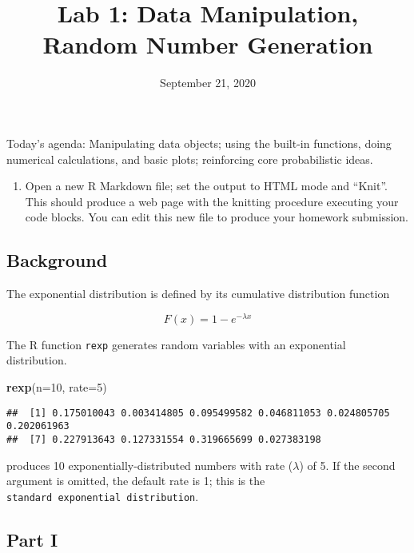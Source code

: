 \documentclass[
]{article}
\title{Lab 1: Data Manipulation, Random Number Generation}
\author{}
\date{\vspace{-2.5em}September 21, 2020}
\newenvironment{Shaded}{\begin{snugshade}}{\end{snugshade}}
\newcommand{\DataTypeTok}[1]{\textcolor[rgb]{0.13,0.29,0.53}{#1}}
\newcommand{\DecValTok}[1]{\textcolor[rgb]{0.00,0.00,0.81}{#1}}
\newcommand{\KeywordTok}[1]{\textcolor[rgb]{0.13,0.29,0.53}{\textbf{#1}}}
\newcommand{\NormalTok}[1]{#1}
\providecommand{\tightlist}{%
  \setlength{\itemsep}{0pt}\setlength{\parskip}{0pt}}
\begin{document}
\maketitle

Today's agenda: Manipulating data objects; using the built-in functions,
doing numerical calculations, and basic plots; reinforcing core
probabilistic ideas.

\begin{enumerate}
\def\labelenumi{\arabic{enumi}.}
\setcounter{enumi}{-1}
\tightlist
\item
  Open a new R Markdown file; set the output to HTML mode and ``Knit''.
  This should produce a web page with the knitting procedure executing
  your code blocks. You can edit this new file to produce your homework
  submission.
\end{enumerate}

\hypertarget{background}{%
\subsection{Background}\label{background}}

The exponential distribution is defined by its cumulative distribution
function

\[F(x) = 1-e^{-\lambda x}\]

The R function \texttt{rexp} generates random variables with an
exponential distribution.

\begin{Shaded}
\begin{Highlighting}[]
\KeywordTok{rexp}\NormalTok{(}\DataTypeTok{n=}\DecValTok{10}\NormalTok{, }\DataTypeTok{rate=}\DecValTok{5}\NormalTok{)}
\end{Highlighting}
\end{Shaded}

\begin{verbatim}
##  [1] 0.175010043 0.003414805 0.095499582 0.046811053 0.024805705 0.202061963
##  [7] 0.227913643 0.127331554 0.319665699 0.027383198
\end{verbatim}

produces 10 exponentially-distributed numbers with rate (\(\lambda\)) of
5. If the second argument is omitted, the default rate is 1; this is the
\texttt{standard\ exponential\ distribution}.

\hypertarget{part-i}{%
\subsection{Part I}\label{part-i}}
\end{document}
